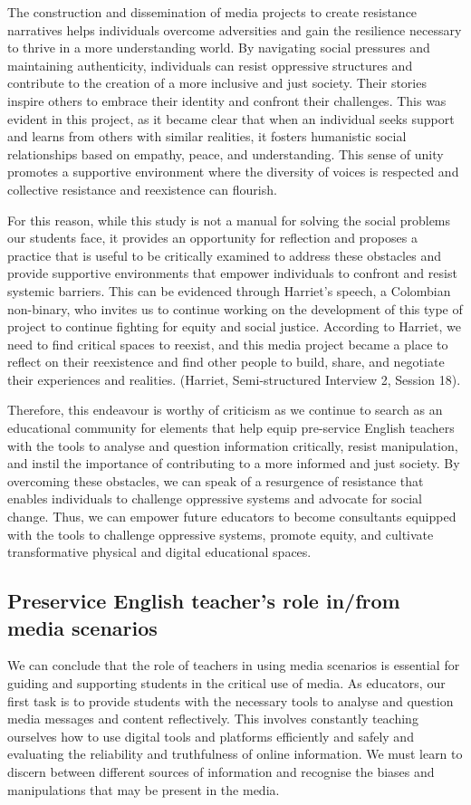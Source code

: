 \documentclass[english]{textolivre}
\begin{document}
The construction and dissemination of media projects to create resistance narratives helps individuals overcome adversities and gain the resilience necessary to thrive in a more understanding world. By navigating social pressures and maintaining authenticity, individuals can resist oppressive structures and contribute to the creation of a more inclusive and just society. Their stories inspire others to embrace their identity and confront their challenges. This was evident in this project, as it became clear that when an individual seeks support and learns from others with similar realities, it fosters humanistic social relationships based on empathy, peace, and understanding. This sense of unity promotes a supportive environment where the diversity of voices is respected and collective resistance and reexistence can flourish.

For this reason, while this study is not a manual for solving the social problems our students face, it provides an opportunity for reflection and proposes a practice that is useful to be critically examined to address these obstacles and provide supportive environments that empower individuals to confront and resist systemic barriers. This can be evidenced through Harriet's speech, a Colombian non-binary, who invites us to continue working on the development of this type of project to continue fighting for equity and social justice. According to Harriet, we need to find critical spaces to reexist, and this media project became a place to reflect on their reexistence and find other people to build, share, and negotiate their experiences and realities. (Harriet, Semi-structured Interview 2, Session 18).

Therefore, this endeavour is worthy of criticism as we continue to search as an educational community for elements that help equip pre-service English teachers with the tools to analyse and question information critically, resist manipulation, and instil the importance of contributing to a more informed and just society. By overcoming these obstacles, we can speak of a resurgence of resistance that enables individuals to challenge oppressive systems and advocate for social change. Thus, we can empower future educators to become consultants equipped with the tools to challenge oppressive systems, promote equity, and cultivate transformative physical and digital educational spaces.

\subsection{Preservice English teacher’s role in/from media scenarios}\label{sec-links}
We can conclude that the role of teachers in using media scenarios is essential for guiding and supporting students in the critical use of media. As educators, our first task is to provide students with the necessary tools to analyse and question media messages and content reflectively. This involves constantly teaching ourselves how to use digital tools and platforms efficiently and safely and evaluating the reliability and truthfulness of online information. We must learn to discern between different sources of information and recognise the biases and manipulations that may be present in the media.
\end{document}
